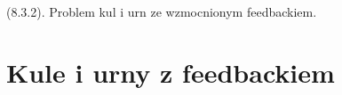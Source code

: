 {
\makeatletter
{}
\makeatother
\graphicspath{{../probabil}}

\begin{questiontext}
	(8.3.2). Problem kul i urn ze wzmocnionym feedbackiem.
\end{questiontext}

\section{Kule i urny z feedbackiem}
 {
 }
}
